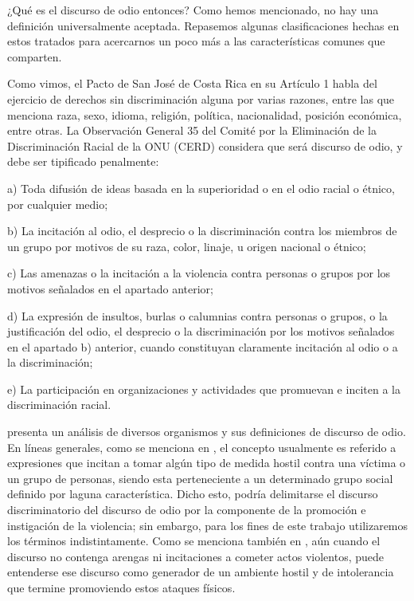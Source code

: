 ¿Qué es el discurso de odio entonces? Como hemos mencionado, no hay una definición universalmente aceptada. Repasemos algunas clasificaciones hechas en estos tratados para acercarnos un poco más a las características comunes que comparten.

Como vimos, el Pacto de San José de Costa Rica en su Artículo 1 habla del ejercicio de derechos sin discriminación alguna por varias razones, entre las que menciona raza, sexo, idioma, religión, política, nacionalidad, posición económica, entre otras. La Observación General 35 del Comité por la Eliminación de la Discriminación Racial de la ONU (CERD) considera que será discurso de odio, y debe ser tipificado penalmente:


\begin{displayquote}

    a) Toda difusión de ideas basada en la superioridad o en el odio racial o étnico, por cualquier medio;

    b) La incitación al odio, el desprecio o la discriminación contra los miembros de un grupo por motivos de su raza, color, linaje, u origen nacional o étnico;

    c) Las amenazas o la incitación a la violencia contra personas o grupos por los motivos señalados en el apartado anterior;

    d) La expresión de insultos, burlas o calumnias contra personas o grupos, o la justificación del odio, el desprecio o la discriminación por los motivos señalados en el apartado b) anterior, cuando constituyan claramente incitación al odio o a la discriminación;

    e) La participación en organizaciones y actividades que promuevan e inciten a la discriminación racial.
\end{displayquote}

\citet{gagliardone2015countering} presenta un análisis de diversos organismos y sus definiciones de discurso de odio. En líneas generales, como se menciona en \citet{CIDH2015}, el concepto usualmente es referido a expresiones que incitan a tomar algún tipo de medida hostil contra una víctima o un grupo de personas, siendo esta perteneciente a un determinado grupo social definido por laguna característica. Dicho esto, podría delimitarse el discurso discriminatorio del discurso de odio por la componente de la promoción e instigación de la violencia; sin embargo, para los fines de este trabajo utilizaremos los términos indistintamente. Como se menciona también en \citet{CIDH2015}, aún cuando el discurso no contenga arengas ni incitaciones a cometer actos violentos, puede entenderse ese discurso como generador de un ambiente hostil y de intolerancia que termine promoviendo estos ataques físicos.


